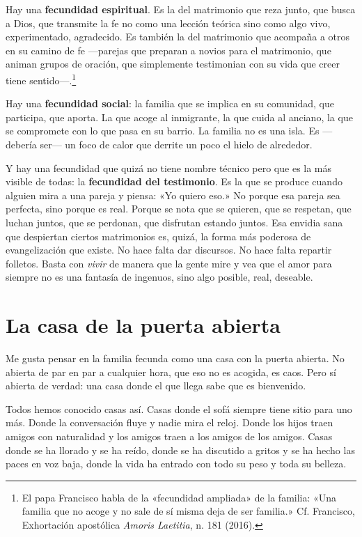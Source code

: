 Hay una \textbf{fecundidad espiritual}. Es la del matrimonio que reza junto, que busca a Dios, que transmite la fe no como una lección teórica sino como algo vivo, experimentado, agradecido. Es también la del matrimonio que acompaña a otros en su camino de fe ---parejas que preparan a novios para el matrimonio, que animan grupos de oración, que simplemente testimonian con su vida que creer tiene sentido---.\footnote{El papa Francisco habla de la «fecundidad ampliada» de la familia: «Una familia que no acoge y no sale de sí misma deja de ser familia.» Cf. Francisco, Exhortación apostólica \textit{Amoris Laetitia}, n. 181 (2016).}

Hay una \textbf{fecundidad social}: la familia que se implica en su comunidad, que participa, que aporta. La que acoge al inmigrante, la que cuida al anciano, la que se compromete con lo que pasa en su barrio. La familia no es una isla. Es ---debería ser--- un foco de calor que derrite un poco el hielo de alrededor.

Y hay una fecundidad que quizá no tiene nombre técnico pero que es la más visible de todas: la \textbf{fecundidad del testimonio}. Es la que se produce cuando alguien mira a una pareja y piensa: «Yo quiero eso.» No porque esa pareja sea perfecta, sino porque es real. Porque se nota que se quieren, que se respetan, que luchan juntos, que se perdonan, que disfrutan estando juntos. Esa envidia sana que despiertan ciertos matrimonios es, quizá, la forma más poderosa de evangelización que existe. No hace falta dar discursos. No hace falta repartir folletos. Basta con \emph{vivir} de manera que la gente mire y vea que el amor para siempre no es una fantasía de ingenuos, sino algo posible, real, deseable.

\section{La casa de la puerta abierta}

Me gusta pensar en la familia fecunda como una casa con la puerta abierta. No abierta de par en par a cualquier hora, que eso no es acogida, es caos. Pero sí abierta de verdad: una casa donde el que llega sabe que es bienvenido.

Todos hemos conocido casas así. Casas donde el sofá siempre tiene sitio para uno más. Donde la conversación fluye y nadie mira el reloj. Donde los hijos traen amigos con naturalidad y los amigos traen a los amigos de los amigos. Casas donde se ha llorado y se ha reído, donde se ha discutido a gritos y se ha hecho las paces en voz baja, donde la vida ha entrado con todo su peso y toda su belleza.

